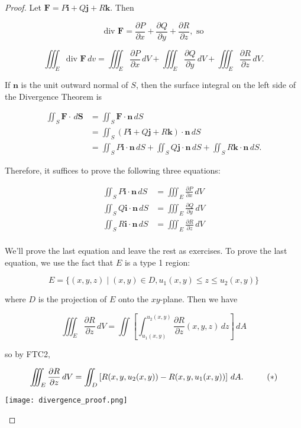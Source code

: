 \documentclass[11pt,oneside,english]{amsart}
\theoremstyle{definition}
\newcommand{\pp}[2]{\frac{\partial{#1}}{\partial{#2}}}
\begin{document}
\begin{proof}
Let $\mathbf{F}=P\mathbf{i}+Q\mathbf{j}+R\mathbf{k}$. Then

\[
\text{div }\mathbf{F}=\pp{P}{x}+\pp{Q}{y}+\pp{R}{z},\text{ so}
\]

\[
\iiint_E\text{div }\mathbf{F}\,dv=\iiint_E\pp{P}{x}\,dV+\iiint_E\pp{Q}{y}\,dV+\iiint_E\pp{R}{z}\,dV.
\]

If $\mathbf{n}$ is the unit outward normal of $S$, then the surface integral on the left side of the Divergence Theorem is

\begin{align*}
\iint_S\mathbf{F}\cdot\,d\mathbf{S}&=\iint_S\mathbf{F}\cdot\mathbf{n}\,dS\\[2mm]
&=\iint_S(P\mathbf{i}+Q\mathbf{j}+R\mathbf{k})\cdot\mathbf{n}\,dS\\[2mm]
&=\iint_SP\mathbf{i}\cdot\mathbf{n}\,dS+\iint_SQ\mathbf{j}\cdot\mathbf{n}\,dS+\iint_SR\mathbf{k}\cdot\mathbf{n}\,dS.
\end{align*}

Therefore, it suffices to prove the following three equations:

\begin{align*}
\iint_SP\mathbf{i}\cdot\mathbf{n}\,dS&=\iiint_E\pp{P}{x}\,dV\\[2mm]
\iint_SQ\mathbf{i}\cdot\mathbf{n}\,dS&=\iiint_E\pp{Q}{y}\,dV\\[2mm]
\iint_SR\mathbf{i}\cdot\mathbf{n}\,dS&=\iiint_E\pp{R}{z}\,dV\\[2mm]
\end{align*}

We'll prove the last equation and leave the rest as exercises. To prove the last equation, we use the fact that $E$ is a type 1 region:

\[
E=\{(x,y,z)\mid (x,y)\in D,u_1(x,y)\leq z\leq u_2(x,y)\}
\]

where $D$ is the projection of $E$ onto the $xy$-plane. Then we have

\[
\iiint_E\pp{R}{z}\,dV=\iint\left[\int_{u_1(x,y)}^{u_2(x,y)}\pp{R}{z}(x,y,z)\,dz\right]\,dA
\]

so by FTC2,

\[
\iiint_E\pp{R}{z}\,dV=\iint_D\left[R(x,y,u_2(x,y))-R(x,y,u_1(x,y))\right]\,dA.\hspace{10mm}(*)
\]

\begin{center}
\texttt{[image: divergence\_proof.png]}
\end{center}



\end{proof}
\end{document}
